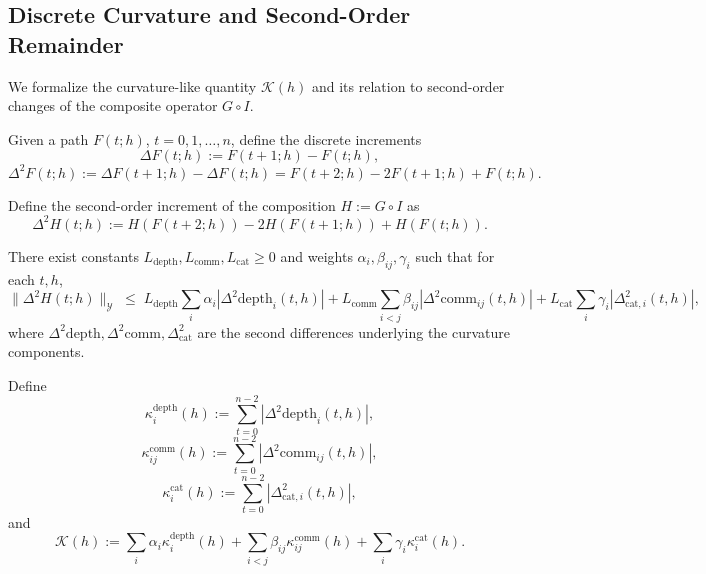 \documentclass[11pt]{article}
\theoremstyle{definition}
\theoremstyle{plain}
\theoremstyle{remark}
\begin{document}
\subsection{Discrete Curvature and Second-Order Remainder}

We formalize the curvature-like quantity \(\mathcal{K}(h)\) and its relation to second-order changes of the composite operator \(G\circ I\).

\begin{adefn}
Given a path \(F(t;h)\), \(t=0,1,\dots,n\), define the discrete increments
\[
  \Delta F(t;h) := F(t+1;h) - F(t;h),
\]
\[
  \Delta^2 F(t;h) := \Delta F(t+1;h) - \Delta F(t;h)
  = F(t+2;h) - 2F(t+1;h)+F(t;h).
\]
\end{adefn}

\begin{adefn}
Define the second-order increment of the composition \(H := G\circ I\) as
\[
  \Delta^2 H(t;h) := H(F(t+2;h)) - 2H(F(t+1;h)) + H(F(t;h)).
\]
\end{adefn}

\begin{aassump}
There exist constants \(L_{\text{depth}},L_{\text{comm}},L_{\text{cat}} \ge 0\) and weights \(\alpha_i,\beta_{ij},\gamma_i\) such that for each \(t,h\),
\[
  \|\Delta^2 H(t;h)\|_{\mathcal{Y}}
  \;\le\;
  L_{\text{depth}} \sum_i \alpha_i |\Delta^2 \text{depth}_i(t,h)|
  + L_{\text{comm}} \sum_{i<j} \beta_{ij} |\Delta^2 \text{comm}_{ij}(t,h)|
  + L_{\text{cat}} \sum_i \gamma_i |\Delta^2_{\text{cat},i}(t,h)|,
\]
where \(\Delta^2 \text{depth}, \Delta^2 \text{comm}, \Delta^2_{\text{cat}}\) are the second differences underlying the curvature components.
\end{aassump}

\begin{adefn}
Define
\[
  \kappa_i^{\text{depth}}(h) := \sum_{t=0}^{n-2} |\Delta^2 \text{depth}_i(t,h)|,
\]
\[
  \kappa_{ij}^{\text{comm}}(h) := \sum_{t=0}^{n-2} |\Delta^2 \text{comm}_{ij}(t,h)|,
\]
\[
  \kappa_i^{\text{cat}}(h) := \sum_{t=0}^{n-2} |\Delta^2_{\text{cat},i}(t,h)|,
\]
and
\[
  \mathcal{K}(h) :=
  \sum_i \alpha_i \kappa_i^{\text{depth}}(h)
  + \sum_{i<j} \beta_{ij} \kappa_{ij}^{\text{comm}}(h)
  + \sum_i \gamma_i \kappa_i^{\text{cat}}(h).
\]
\end{adefn}
\end{document}
